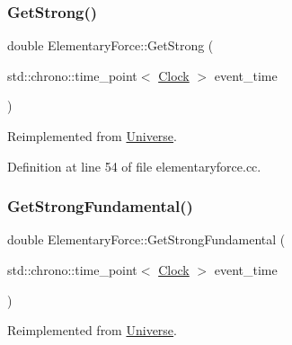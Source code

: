\mbox{\label{class_elementary_force_aaa1cde27b1508831f67353eb39745a7e}} 
\subsubsection{\texorpdfstring{Get\+Strong()}{GetStrong()}}
{\footnotesize\ttfamily double Elementary\+Force\+::\+Get\+Strong (\begin{DoxyParamCaption}\item[{std\+::chrono\+::time\+\_\+point$<$ \mbox{\hyperlink{universe_8h_a0ef8d951d1ca5ab3cfaf7ab4c7a6fd80}{Clock}} $>$}]{event\+\_\+time }\end{DoxyParamCaption})\hspace{0.3cm}{\ttfamily [virtual]}}



Reimplemented from \mbox{\hyperlink{class_universe_acb453ce71da418c5b5617fecede9571b}{Universe}}.



Definition at line 54 of file elementaryforce.\+cc.

\mbox{\label{class_elementary_force_a0974d6537c07dac2453d2a607324fa21}} 
\subsubsection{\texorpdfstring{Get\+Strong\+Fundamental()}{GetStrongFundamental()}}
{\footnotesize\ttfamily double Elementary\+Force\+::\+Get\+Strong\+Fundamental (\begin{DoxyParamCaption}\item[{std\+::chrono\+::time\+\_\+point$<$ \mbox{\hyperlink{universe_8h_a0ef8d951d1ca5ab3cfaf7ab4c7a6fd80}{Clock}} $>$}]{event\+\_\+time }\end{DoxyParamCaption})\hspace{0.3cm}{\ttfamily [virtual]}}



Reimplemented from \mbox{\hyperlink{class_universe_ab44daccba01ee7e3cf9b50bba83dd19e}{Universe}}.



